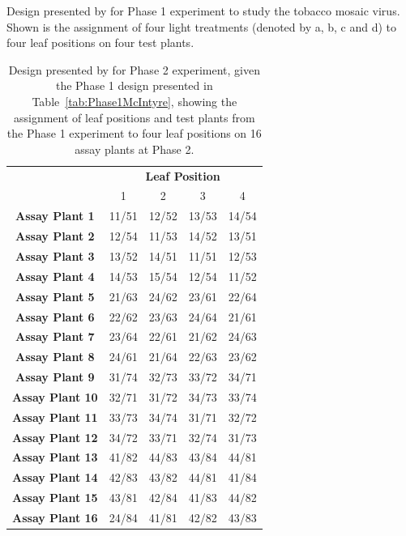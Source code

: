 Design presented by \cite{McIntyre1955} for Phase 1 experiment to study the tobacco mosaic virus. Shown is the assignment of four light treatments (denoted by a, b, c and d) to four leaf positions on four test plants.
\begin{table}[ht]
\centering
\caption{Design presented by \cite{McIntyre1955} for Phase 2 experiment, given the Phase 1 design presented in Table~\ref{tab:Phase1McIntyre}, showing the assignment of leaf positions and test plants from the Phase 1 experiment to four leaf positions on 16 assay plants at Phase 2.}
\begin{tabular}[t]{|c|cccc|} \hline
& \multicolumn{4}{c|}{\textbf{Leaf Position}}\\
& 1 & 2 & 3 & 4 \\\hline
{\bf Assay Plant 1}  & 11/51 & 12/52 & 13/53 & 14/54 \\ \hline
{\bf Assay Plant 2}  & 12/54 & 11/53 & 14/52 & 13/51 \\ \hline
{\bf Assay Plant 3}  & 13/52 & 14/51 & 11/51 & 12/53 \\ \hline
{\bf Assay Plant 4}  & 14/53 & 15/54 & 12/54 & 11/52 \\ \hline
{\bf Assay Plant 5}  & 21/63 & 24/62 & 23/61 & 22/64 \\ \hline
{\bf Assay Plant 6}  & 22/62 & 23/63 & 24/64 & 21/61 \\ \hline
{\bf Assay Plant 7}  & 23/64 & 22/61 & 21/62 & 24/63 \\ \hline
{\bf Assay Plant 8}  & 24/61 & 21/64 & 22/63 & 23/62 \\ \hline
{\bf Assay Plant 9}  & 31/74 & 32/73 & 33/72 & 34/71 \\ \hline
{\bf Assay Plant 10} & 32/71 & 31/72 & 34/73 & 33/74 \\ \hline
{\bf Assay Plant 11} & 33/73 & 34/74 & 31/71 & 32/72 \\ \hline
{\bf Assay Plant 12} & 34/72 & 33/71 & 32/74 & 31/73 \\ \hline
{\bf Assay Plant 13} & 41/82 & 44/83 & 43/84 & 44/81 \\ \hline
{\bf Assay Plant 14} & 42/83 & 43/82 & 44/81 & 41/84 \\ \hline
{\bf Assay Plant 15} & 43/81 & 42/84 & 41/83 & 44/82 \\ \hline
{\bf Assay Plant 16} & 24/84 & 41/81 & 42/82 & 43/83 \\ \hline
\end{tabular} 
\label{tab:Phase2McIntyre}
\end{table}


